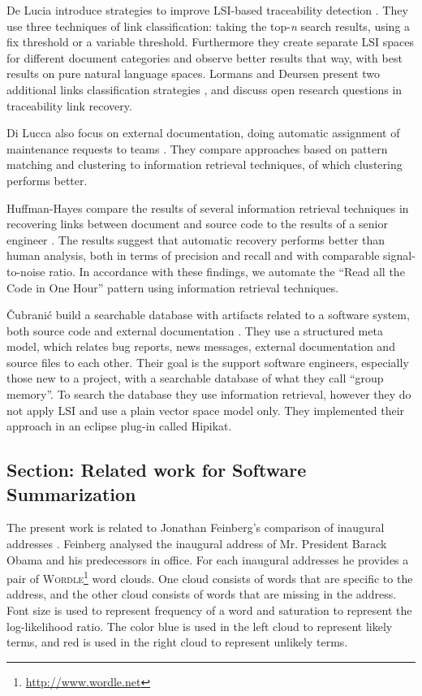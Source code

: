 De Lucia \etal introduce strategies to improve LSI-based traceability detection \cite{Luci04a}. They use three techniques of link classification: taking the top-\emph{n} search results, using a fix threshold or a variable threshold. Furthermore they create separate LSI spaces for different document categories and observe better results that way, with best results on pure natural language spaces. Lormans and Deursen present two additional links classification strategies \cite{Lorm06a}, and discuss open research questions in traceability link recovery.

Di Lucca \etal also focus on external documentation, doing automatic assignment of maintenance requests to teams \cite{Lucc02b}. They compare approaches based on pattern matching and clustering to information retrieval techniques, of which clustering performs better.

Huffman-Hayes \etal compare the results of several information retrieval techniques in recovering links between document and source code to the results of a senior engineer \cite{Huff06a}. The results suggest that automatic recovery performs better than human analysis, both in terms of precision and recall and with comparable signal-to-noise ratio. In accordance with these findings, we automate the ``Read all the Code in One Hour'' pattern using information retrieval techniques.

\v{C}ubrani\'{c} \etal build a searchable database with artifacts related to a software system, both source code and external documentation \cite{Cubr03a}. They use a structured meta model, which relates bug reports, news messages, external documentation and source files to each other. Their goal is the support software engineers, especially those new to a project, with a searchable database of what they call ``group memory''. To search the database they use information retrieval, however they do not apply LSI and use a plain vector space model only. They implemented their approach in an eclipse plug-in called Hipikat.

\subsection{Section: Related work for Software Summarization}\label{relwork}

The present work is related to Jonathan Feinberg's comparison of inaugural addresses \cite{Feinberg09blog}. Feinberg analysed the inaugural address of Mr. President Barack Obama and his predecessors in office. For each inaugural addresses he provides a pair of \textsc{Wordle}\footnote{\url{http://www.wordle.net}} word clouds. One cloud consists of words that are specific to the address, and the other cloud consists of words that are missing in the address. Font size is used to represent frequency of a word and saturation to represent the log-likelihood ratio. The color blue is used in the left cloud to represent likely terms, and red is used in the right cloud to represent unlikely terms.

